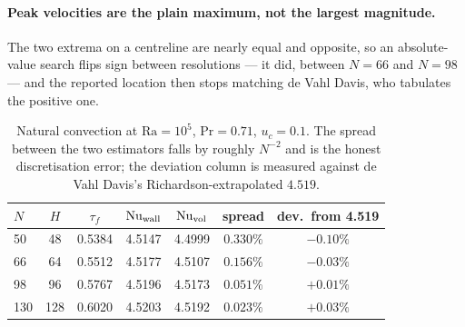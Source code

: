 \documentclass[11pt,a4paper]{article}
\begin{document}
\paragraph{Peak velocities are the plain maximum, not the largest magnitude.}
The two extrema on a centreline are nearly equal and opposite, so an
absolute-value search flips sign between resolutions --- it did, between $N=66$
and $N=98$ --- and the reported location then stops matching de Vahl Davis, who
tabulates the positive one.

\begin{table}[h]
\centering\small
\begin{tabular}{lcccccc}
\toprule
$N$ & $H$ & $\tau_f$ & $\mathrm{Nu}_{\rm wall}$ & $\mathrm{Nu}_{\rm vol}$ &
spread & dev.\ from 4.519 \\
\midrule
50  & 48  & 0.5384 & 4.5147 & 4.4999 & $0.330\%$ & $-0.10\%$ \\
66  & 64  & 0.5512 & 4.5177 & 4.5107 & $0.156\%$ & $-0.03\%$ \\
98  & 96  & 0.5767 & 4.5196 & 4.5173 & $0.051\%$ & $+0.01\%$ \\
130 & 128 & 0.6020 & 4.5203 & 4.5192 & $0.023\%$ & $+0.03\%$ \\
\bottomrule
\end{tabular}
\caption{Natural convection at $\mathrm{Ra}=10^5$, $\mathrm{Pr}=0.71$,
$u_c=0.1$. The spread between the two estimators falls by roughly $N^{-2}$ and
is the honest discretisation error; the deviation column is measured against de
Vahl Davis's Richardson-extrapolated $4.519$.\label{tab:zhounat1e5}}
\end{table}
\end{document}
